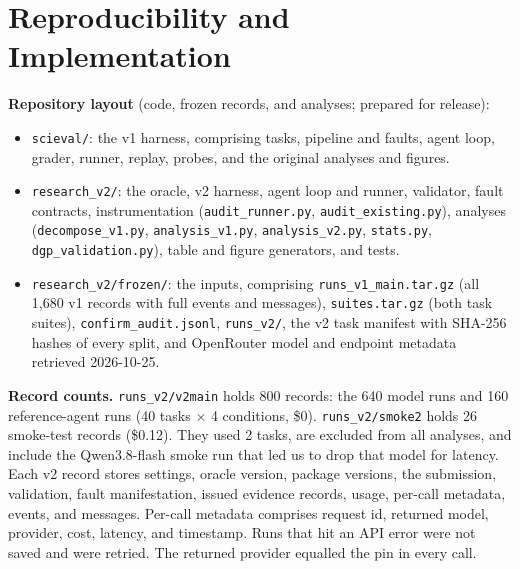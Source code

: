 \section{Reproducibility and Implementation}
\label{app:repro}

\textbf{Repository layout} (code, frozen records, and analyses; prepared for release):
\begin{itemize}
\item \texttt{scieval/}: the v1 harness, comprising tasks, pipeline and
faults, agent loop, grader, runner, replay, probes, and the original analyses
and figures.
\item \texttt{research\_v2/}: the oracle, v2 harness, agent loop and runner,
validator, fault contracts, instrumentation (\texttt{audit\_runner.py},
\texttt{audit\_existing.py}), analyses (\texttt{decompose\_v1.py},
\texttt{analysis\_v1.py}, \texttt{analysis\_v2.py}, \texttt{stats.py},
\texttt{dgp\_validation.py}), table and figure generators, and tests.
\item \texttt{research\_v2/frozen/}: the inputs, comprising
\texttt{runs\_v1\_main.tar.gz} (all 1,680 v1 records with full events and
messages), \texttt{suites.tar.gz} (both task suites),
\texttt{confirm\_audit.jsonl}, \texttt{runs\_v2/}, the v2 task manifest with
SHA-256 hashes of every split, and OpenRouter model and endpoint metadata
retrieved 2026-10-25.
\end{itemize}

\textbf{Record counts.} \texttt{runs\_v2/v2main} holds 800 records: the 640
model runs and 160 reference-agent runs (40 tasks $\times$ 4 conditions,
\$0). \texttt{runs\_v2/smoke2} holds 26 smoke-test records (\$0.12). They
used 2 tasks, are excluded from all analyses, and include the Qwen3.8-flash
smoke run that led us to drop that model for latency. Each v2 record stores
settings, oracle version, package versions, the submission, validation, fault
manifestation, issued evidence records, usage, per-call metadata, events, and
messages. Per-call metadata comprises request id, returned model, provider,
cost, latency, and timestamp. Runs that hit an API error were not saved and
were retried. The returned provider equalled the pin in every call.

